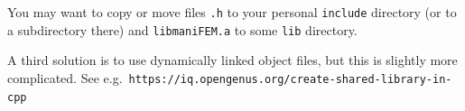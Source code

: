 You may want to copy or move files {\small\tt *.h} to your personal {\small\tt include} directory
(or to a subdirectory there) and {\small\tt libmaniFEM.a} to some {\small\tt lib} directory.

A third solution is to use dynamically linked object files,
but this is slightly more complicated.
See e.g.\ {\small\tt https://iq.opengenus.org/create-shared-library-in-cpp}


